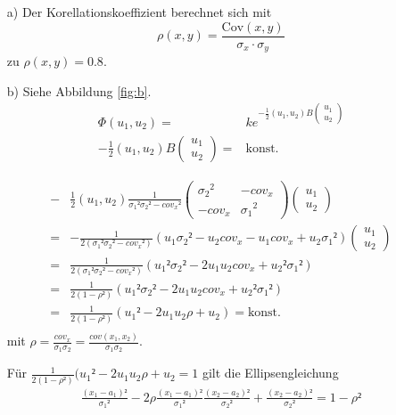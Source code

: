 \begin{itemize}
\item[a)] Der Korellationskoeffizient berechnet sich mit
\begin{equation}
\rho(x,y)=\frac{\text{Cov}(x,y)}{\sigma_x\cdot\sigma_y}
\end{equation}
zu $\rho(x,y)=0.8.$

\item[b)] Siehe Abbildung \ref{fig:b}.
\begin{align*}
\Phi(u_1,u_2) =& ke^{-\frac{1}{2}(u_1,u_2)B
\begin{pmatrix}
 u_1\\
 u_2
\end{pmatrix}
}\\
-\frac{1}{2}(u_1,u_2)B
\begin{pmatrix}
 u_1\\
 u_2
\end{pmatrix}
= &\text{konst.}
\end{align*}

\begin{align*}
-&\frac{1}{2}(u_1,u_2)
\frac{1}{{\sigma_1}²{\sigma_2}²-{cov_x}²}
\begin{pmatrix}
{\sigma_2}^2 & -cov_x\\
-cov_x &{\sigma_1}^2 
\end{pmatrix}
\begin{pmatrix}
 u_1\\
 u_2
\end{pmatrix}
\\=&-\frac{1}{2({\sigma_1}²{\sigma_2}²-{cov_x}²)}
(u_1{\sigma_2}²-u_2cov_x-u_1cov_x+u_2{\sigma_1}²)
\begin{pmatrix}
 u_1\\
 u_2
\end{pmatrix}\\
=&\frac{1}{2({\sigma_1}²{\sigma_2}²-{cov_x}²)}
({u_1}²{\sigma_2}²-2u_1u_2cov_x+{u_2}²{\sigma_1}²)\\
=&\frac{1}{2(1-\rho²)}
({u_1}²{\sigma_2}²-2u_1u_2cov_x+{u_2}²{\sigma_1}²)\\
=&\frac{1}{2(1-\rho²)}
({u_1}²-2u_1u_2\rho+{u_2})=\text{konst.}\\
\end{align*}
mit $\rho=\frac{cov_x}{\sigma_1\sigma_2}=\frac{cov(x_1,x_2)}{\sigma_1\sigma_2}.$

Für $\frac{1}{2(1-\rho²)}({u_1}²-2u_1u_2\rho+{u_2}=1$ gilt die Ellipsengleichung
\begin{align*}
\frac{(x_1-a_1)²}{{\sigma_1}²}-2\rho\frac{(x_1-a_1)²}{{\sigma_1}²}\frac{(x_2-a_2)²}{{\sigma_2}²}+\frac{(x_2-a_2)²}{{\sigma_2}²}= 1-\rho²
\end{align*}


\end{itemize}
